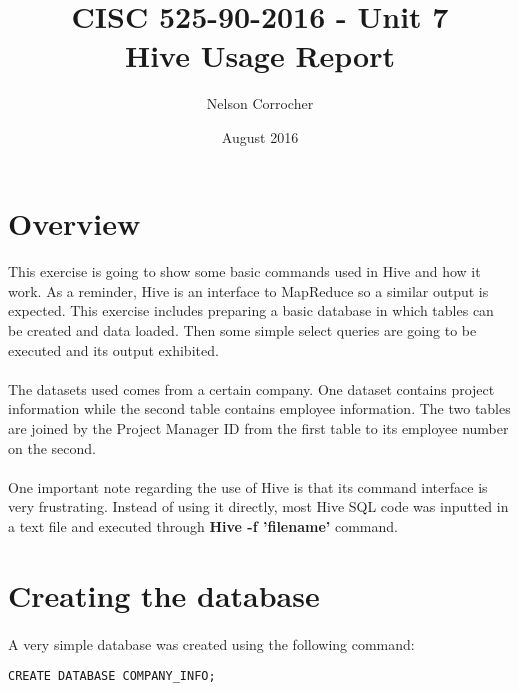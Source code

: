 
\title{CISC 525-90-2016 - Unit 7\\ Hive Usage Report}
\author{Nelson Corrocher}
\date{August 2016}

\maketitle
\section{Overview}
\paragraph{}This exercise is going to show some basic commands used in Hive and how it work. As a reminder, Hive is an interface to MapReduce so a similar output is expected. This exercise includes preparing a basic database in which tables can be created and data loaded. Then some simple select queries are going to be executed and its output exhibited. 

\paragraph{}The datasets used comes from a certain company. One dataset contains project information while the second table contains employee information. The two tables are joined by the Project Manager ID from the first table to its employee number on the second.

\paragraph{}One important note regarding the use of Hive is that its command interface is very frustrating. Instead of using it directly, most Hive SQL code was inputted in a text file and executed through \textbf{Hive -f 'filename'} command. 

\section{Creating the database} 
\paragraph{}A very simple database was created using the following command:
\begin{lstlisting}
CREATE DATABASE COMPANY_INFO;
\end{lstlisting}

